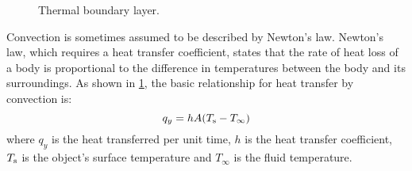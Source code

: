 \begin{figure}[!htp]
	\centering{}
	\caption{Thermal boundary layer.}
	\label{Thermal_boundary_layer}
\end{figure}

Convection is sometimes assumed to be described by Newton's law.
Newton's law, which requires a heat transfer coefficient, states that the rate of heat loss of a body is proportional to the difference in temperatures between the body and its surroundings. %
As shown in \ref{Thermal_boundary_layer}, the basic relationship for heat transfer by convection is:
    \begin{equation}
    q_y=hA(T_{\rm{s}}-T_{\infty})
    \end{equation}
where $q_y$ is the heat transferred per unit time, $h$ is the heat transfer coefficient, $T_{\rm{s}}$ is the object's surface temperature and $T_{\infty}$ is the fluid temperature.



